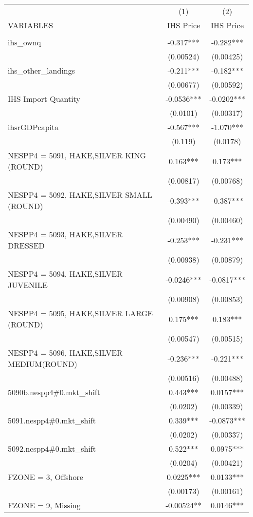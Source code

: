 \begin{tabular}{lcc} \hline
 & (1) & (2) \\
VARIABLES & IHS Price & IHS Price \\ \hline
 &  &  \\
ihs\_ownq & -0.317*** & -0.282*** \\
 & (0.00524) & (0.00425) \\
ihs\_other\_landings & -0.211*** & -0.182*** \\
 & (0.00677) & (0.00592) \\
IHS Import Quantity & -0.0536*** & -0.0202*** \\
 & (0.0101) & (0.00317) \\
ihsrGDPcapita & -0.567*** & -1.070*** \\
 & (0.119) & (0.0178) \\
NESPP4 = 5091, HAKE,SILVER KING (ROUND) & 0.163*** & 0.173*** \\
 & (0.00817) & (0.00768) \\
NESPP4 = 5092, HAKE,SILVER SMALL (ROUND) & -0.393*** & -0.387*** \\
 & (0.00490) & (0.00460) \\
NESPP4 = 5093, HAKE,SILVER DRESSED & -0.253*** & -0.231*** \\
 & (0.00938) & (0.00879) \\
NESPP4 = 5094, HAKE,SILVER JUVENILE & -0.0246*** & -0.0817*** \\
 & (0.00908) & (0.00853) \\
NESPP4 = 5095, HAKE,SILVER LARGE (ROUND) & 0.175*** & 0.183*** \\
 & (0.00547) & (0.00515) \\
NESPP4 = 5096, HAKE,SILVER MEDIUM(ROUND) & -0.236*** & -0.221*** \\
 & (0.00516) & (0.00488) \\
5090b.nespp4\#0.mkt\_shift & 0.443*** & 0.0157*** \\
 & (0.0202) & (0.00339) \\
5091.nespp4\#0.mkt\_shift & 0.339*** & -0.0873*** \\
 & (0.0202) & (0.00337) \\
5092.nespp4\#0.mkt\_shift & 0.522*** & 0.0975*** \\
 & (0.0204) & (0.00421) \\
FZONE = 3, Offshore & 0.0225*** & 0.0133*** \\
 & (0.00173) & (0.00161) \\
FZONE = 9, Missing & -0.00524** & 0.0146*** \\

\end{tabular}
